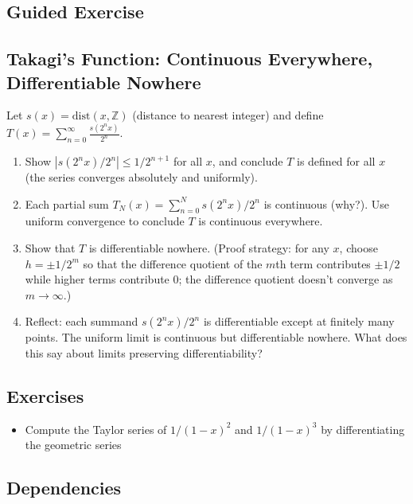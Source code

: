 \documentclass[
  10pt,
  letterpaper,
]{scrbook}
\providecommand{\tightlist}{%
  \setlength{\itemsep}{0pt}\setlength{\parskip}{0pt}}
\newcommand{\ZZ}{\mathbb{Z}}
\begin{document}
\subsection{Guided Exercise}\label{guided-exercise-17}

\subsection{Takagi's Function: Continuous Everywhere, Differentiable
Nowhere}\label{takagis-function-continuous-everywhere-differentiable-nowhere}

Let \(s(x) = \mathrm{dist}(x, \ZZ)\) (distance to nearest integer) and
define \(T(x) = \sum_{n=0}^{\infty} \frac{s(2^n x)}{2^n}\).

\begin{enumerate}
\def\labelenumi{(\alph{enumi})}
\item
  Show \(|s(2^n x)/2^n| \leq 1/2^{n+1}\) for all \(x\), and conclude
  \(T\) is defined for all \(x\) (the series converges absolutely and
  uniformly).
\item
  Each partial sum \(T_N(x) = \sum_{n=0}^{N} s(2^n x)/2^n\) is
  continuous (why?). Use uniform convergence to conclude \(T\) is
  continuous everywhere.
\item
  Show that \(T\) is differentiable nowhere. (Proof strategy: for any
  \(x\), choose \(h = \pm 1/2^m\) so that the difference quotient of the
  \(m\)th term contributes \(\pm 1/2\) while higher terms contribute 0;
  the difference quotient doesn't converge as \(m \to \infty\).)
\item
  Reflect: each summand \(s(2^n x)/2^n\) is differentiable except at
  finitely many points. The uniform limit is continuous but
  differentiable nowhere. What does this say about limits preserving
  differentiability?
\end{enumerate}

\subsection{Exercises}\label{exercises-31}

\begin{itemize}
\tightlist
\item
  Compute the Taylor series of \(1/(1-x)^2\) and \(1/(1-x)^3\) by
  differentiating the geometric series
\end{itemize}

\subsection{Dependencies}\label{dependencies-31}
\end{document}
